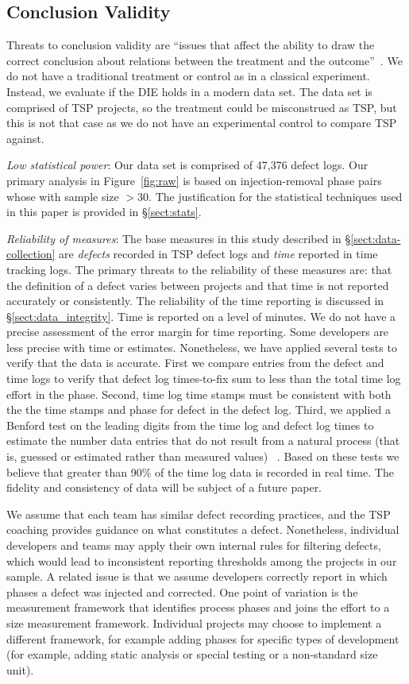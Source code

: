 \documentclass[smallcondensed]{svjour3}
\newcommand{\tion}[1]{\S\ref{sect:#1}}
\newcommand{\fig}[1]{Figure~\ref{fig:#1}}
\begin{document}
\subsection{Conclusion Validity}
\label{sect:conclusion_validity}
Threats to conclusion validity are ``issues that affect the ability to draw the correct conclusion about relations between the treatment and the outcome''~\cite{wohlin2012}. We do not have a traditional treatment or control as in a classical experiment. Instead, we evaluate if the DIE holds in a modern data set. The data set is comprised of TSP projects, so the treatment could be misconstrued as TSP, but this is not that case as we do not have an experimental control to compare TSP against. 

\textit{Low statistical power}: Our data set is comprised of 47,376 defect logs. Our primary analysis in \fig{raw} is based on injection-removal phase pairs whose with sample size $>30$. The justification for the statistical techniques used in this paper is provided in \tion{stats}.

\textit{Reliability of measures}: The base measures in this study described in \tion{data-collection} are \textit{defects} recorded in TSP defect logs and \textit{time} reported in time tracking logs. The primary threats to the reliability of these measures are: that the definition of a defect varies between projects and that time is not reported accurately or consistently. The reliability of the time reporting is discussed in \tion{data_integrity}. Time is reported on a level of minutes. We do not have a precise assessment of the error margin for time reporting. Some developers are less precise with time or estimates. Nonetheless, we have applied several tests to verify that the data is accurate. First we compare entries from the defect and time logs to verify that defect log times-to-fix sum to less than the total time log effort in the phase. Second, time log time stamps must be consistent with both the the time stamps and phase for defect in the defect log. Third, we applied a Benford test on the leading digits from the time log  and defect log times to estimate the number data entries that do not result from a natural process (that is, guessed or estimated rather than measured values) ~\cite{shirai14}.  Based on these tests we believe that greater than 90\% of the time log data is recorded in real time. The fidelity and consistency of data will be subject of a future paper. 

We assume that each team has similar defect recording practices, and the TSP coaching provides guidance on what constitutes a defect. Nonetheless, individual developers and teams may apply their own internal rules for filtering defects, which would lead to inconsistent reporting thresholds among the projects in our sample. A related issue is that we assume developers correctly report in which phases a defect was injected and corrected. One point of variation is the measurement framework that identifies process phases and joins the effort to a size measurement framework. Individual projects may choose to implement a different framework, for example adding phases for specific types of development (for example, adding static analysis or special testing or a non-standard size unit).  
\end{document}
